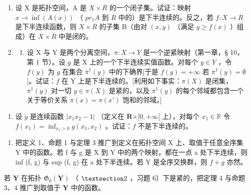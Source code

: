 \begin{enumerate}
\def\labelenumi{\arabic{enumi})}
\setcounter{enumi}{7}
\item
设 X 是拓扑空间，A 是 \(X \times \overline{R}\) 的一个闭子集。试证：映射 \(x \to \inf(A(x))\) （ \(pr_{1}A\) 到 \(\overline{R}\) 中的）是下半连续的。反之，若 \(f: X \to \overline{R}\) 是下半连续函数，则 \(X \times \overline{R}\) 的子集 B（由对 \((x, y)\) （满足 \(y \geqslant f(x)\) ）组成）在 \(X \times \overline{R}\) 中是闭的。
\item
  \begin{enumerate}
  \def\labelenumii{\alph{enumii})}
  \tightlist
  \item
设 X 与 Y 是两个分离空间，\(\pi: X \to Y\) 是一个逆紧映射（第一章，§ 10，第 1 节）。设 \(g\) 是 X 上的一个下半连续实值函数。对每个 \(y \in Y\) ，令 \(f(y)\) 为 \(g\) 在集合 \(\overline{\pi}^{1}(y)\) 中的下确界{[}于是 \(f(y) = +\infty\) 若 \(\overline{\pi}^{1}(y) = \emptyset\) {]}。试证：\(f\) 在 Y 上是下半连续的。{[}利用如下事实：\(\pi(X)\) 是闭集，\(\overline{\pi}^{1}(y)\) 对一切 \(y \in \pi(X)\) 是紧的，以及 \(\overline{\pi}^{1}(y)\) 的每个邻域都包含一个关于等价关系 \(\pi(x) = \pi(x')\) 饱和的邻域。{]}
  \end{enumerate}
\end{enumerate}

\begin{enumerate}
\def\labelenumi{\alph{enumi})}
\setcounter{enumi}{1}
\tightlist
\item
设 \(g\) 是连续函数 \(|x_1 x_2 - 1|\) （定义在 \(\mathbf{R} \times ]0, +\infty[\) 上），对每个 \(x_1 \in \mathbb{R}\) 令 \(f(x_1) = \inf_{x_1 > 0} g(x_1, x_2)\) 。试证：\(f\) 不是下半连续的。
\end{enumerate}

\begin{enumerate}
\def\labelenumi{\arabic{enumi})}
\setcounter{enumi}{9}
\tightlist
\item
把定义 1、命题 1 与定理 3 推广到定义在拓扑空间 X 上、取值于任意全序集 Y 中的函数。若 f 与 g 是 X 到 Y 中的两个映射，都在一点 a 处下半连续，则 inf (f, g) 与 sup (f, g) 在 a 处下半连续。若 Y 是全序交换群，则 \(f + g\) 亦然。
\end{enumerate}

若 \(\mathbf{Y}\) 在拓扑 \(\mathfrak{G}_{0}(\mathbf{Y})\) （ \(\S 2\) ，习题 6）下是紧的，把定理 4 与命题 3、4 推广到取值于 \(\mathbf{Y}\) 中的函数。

